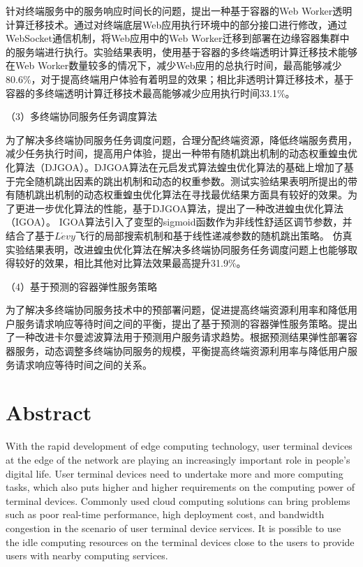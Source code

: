针对终端服务中的服务响应时间长的问题，提出一种基于容器的Web Worker透明计算迁移技术。通过对终端底层Web应用执行环境中的部分接口进行修改，通过WebSocket通信机制，将Web应用中的Web Worker迁移到部署在边缘容器集群中的服务端进行执行。实验结果表明，使用基于容器的多终端透明计算迁移技术能够在Web Worker数量较多的情况下，减少Web应用的总执行时间，最高能够减少80.6\%，对于提高终端用户体验有着明显的效果；相比非透明计算迁移技术，基于容器的多终端透明计算迁移技术最高能够减少应用执行时间33.1\%。

（3）多终端协同服务任务调度算法 

为了解决多终端协同服务任务调度问题，合理分配终端资源，降低终端服务费用，减少任务执行时间，提高用户体验，提出一种带有随机跳出机制的动态权重蝗虫优化算法（DJGOA）。DJGOA算法在元启发式算法蝗虫优化算法的基础上增加了基于完全随机跳出因素的跳出机制和动态的权重参数。测试实验结果表明所提出的带有随机跳出机制的动态权重蝗虫优化算法在寻找最优结果方面具有较好的效果。为了更进一步优化算法的性能，基于DJGOA算法，提出了一种改进蝗虫优化算法（IGOA）。
IGOA算法引入了变型的sigmoid函数作为非线性舒适区调节参数，并结合了基于$L\acute{e}vy$飞行的局部搜索机制和基于线性递减参数的随机跳出策略。
仿真实验结果表明，改进蝗虫优化算法在解决多终端协同服务任务调度问题上也能够取得较好的效果，相比其他对比算法效果最高提升31.9\%。

（4）基于预测的容器弹性服务策略

为了解决多终端协同服务技术中的预部署问题，促进提高终端资源利用率和降低用户服务请求响应等待时间之间的平衡，提出了基于预测的容器弹性服务策略。提出了一种改进卡尔曼滤波算法用于预测用户服务请求趋势。根据预测结果弹性部署容器服务，动态调整多终端协同服务的规模，平衡提高终端资源利用率与降低用户服务请求响应等待时间之间的关系。

\chapter*{Abstract}%

With the rapid development of edge computing technology, user terminal devices at the edge of the network are playing an increasingly important role in people's digital life.
User terminal devices need to undertake more and more computing tasks, which also puts higher and higher requirements on the computing power of terminal devices.
Commonly used cloud computing solutions can bring problems such as poor real-time performance, high deployment cost, and bandwidth congestion in the scenario of user terminal device services. It is possible to use the idle computing resources on the terminal devices close to the users to provide users with nearby computing services. 

